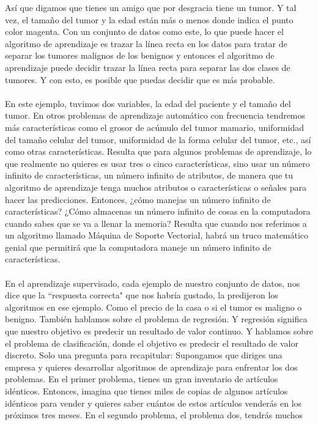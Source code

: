 \documentclass{report}
\begin{document}
Así que digamos que
tienes un amigo que por desgracia tiene un tumor. Y tal vez, el tamaño del tumor y la edad
están más o menos donde indica el punto color magenta. Con un conjunto de datos como este, lo que puede hacer el
algoritmo de aprendizaje es trazar la línea recta en los datos para tratar de separar los
tumores malignos de los benignos y entonces el algoritmo de aprendizaje puede decidir
trazar la línea recta para separar las dos clases de tumores.
Y con esto, es posible que puedas decidir que es más probable.\\\\En este ejemplo, tuvimos dos variables,
la edad del paciente y el tamaño del tumor. En otros problemas de aprendizaje automático
con frecuencia tendremos más características como el grosor de acúmulo del
tumor mamario, uniformidad del tamaño celular del tumor, uniformidad de la forma celular del
tumor, etc., así como otras características. Resulta que para algunos problemas
de aprendizaje, lo que realmente no quieres es usar tres o cinco características, sino
usar un número infinito de características, un número infinito de
atributos, de manera que tu algoritmo de aprendizaje tenga muchos atributos o
características o señales para hacer las predicciones. Entonces, ¿cómo manejas un
número infinito de características? ¿Cómo almacenas un número infinito de
cosas en la computadora cuando sabes que se va a llenar la memoria? Resulta
que cuando nos referimos a un algoritmo llamado Máquina de
Soporte Vectorial, habrá un truco matemático genial que permitirá que la computadora maneje
un número infinito de características. \\\\ En el aprendizaje supervisado, cada ejemplo de
nuestro conjunto de datos, nos dice que la ``respuesta correcta" que nos habría gustado,
la predijeron los algoritmos en ese ejemplo. Como el precio de la
casa o si el tumor es maligno o benigno. También hablamos sobre el
problema de regresión. Y regresión significa que nuestro objetivo es predecir
un resultado de valor continuo. Y hablamos sobre el problema de clasificación, donde
el objetivo es predecir el resultado de valor discreto. Solo una pregunta para recapitular:
Supongamos que diriges una empresa y quieres desarrollar algoritmos de aprendizaje
para enfrentar los dos problemas. En el primer problema, tienes un gran inventario de
artículos idénticos. Entonces, imagina que tienes miles de copias de algunos artículos
idénticos para vender y quieres saber cuántos de estos artículos venderás en los
próximos tres meses. En el segundo problema, el problema dos, tendrás muchos
\end{document}
